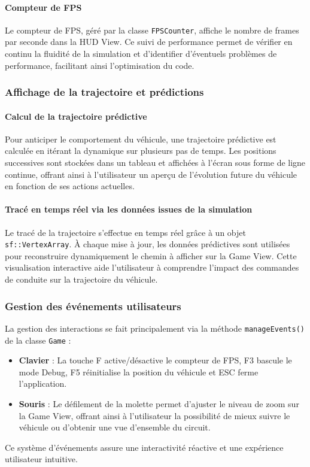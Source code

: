 \begin{itemize}
\paragraph{Compteur de FPS}
Le compteur de FPS, géré par la classe \texttt{FPSCounter}, affiche le nombre de frames par seconde dans la HUD View.
Ce suivi de performance permet de vérifier en continu la fluidité de la simulation et d'identifier d'éventuels problèmes de performance, facilitant ainsi l'optimisation du code.

\subsubsection{Affichage de la trajectoire et prédictions}\label{subsubsec:affichage-de-la-trajectoire-et-predictions}

\paragraph{Calcul de la trajectoire prédictive}
Pour anticiper le comportement du véhicule, une trajectoire prédictive est calculée en itérant la dynamique sur plusieurs pas de temps.
Les positions successives sont stockées dans un tableau et affichées à l'écran sous forme de ligne continue, offrant ainsi à l'utilisateur un aperçu de l'évolution future du véhicule en fonction de ses actions actuelles.

\paragraph{Tracé en temps réel via les données issues de la simulation}
Le tracé de la trajectoire s'effectue en temps réel grâce à un objet \texttt{sf::VertexArray}.
À chaque mise à jour, les données prédictives sont utilisées pour reconstruire dynamiquement le chemin à afficher sur la Game View.
Cette visualisation interactive aide l'utilisateur à comprendre l'impact des commandes de conduite sur la trajectoire du véhicule.

\subsubsection{Gestion des événements utilisateurs}\label{subsubsec:gestion-des-evenements-utilisateurs}
La gestion des interactions se fait principalement via la méthode \texttt{manageEvents()} de la classe \texttt{Game} :
\begin{itemize}
    \item \textbf{Clavier} : La touche F active/désactive le compteur de FPS, F3 bascule le mode Debug, F5 réinitialise la position du véhicule et ESC ferme l'application.
    \item \textbf{Souris} : Le défilement de la molette permet d'ajuster le niveau de zoom sur la Game View, offrant ainsi à l'utilisateur la possibilité de mieux suivre le véhicule ou d'obtenir une vue d'ensemble du circuit.
\end{itemize}
Ce système d'événements assure une interactivité réactive et une expérience utilisateur intuitive.


\end{itemize}
